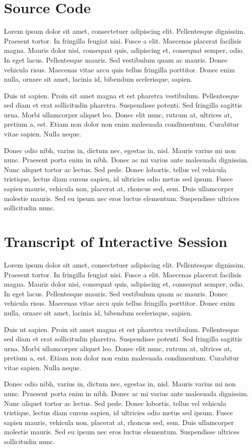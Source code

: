 \documentclass[11pt,letterpaper,onecolumn,twoside,openright,draft]{report}
\begin{document}
\chapter{Source Code}
Lorem ipsum dolor sit amet, consectetuer adipiscing elit. Pellentesque dignissim.
Praesent tortor.
In fringilla feugiat nisi.
Fusce a elit.
Maecenas placerat facilisis magna.
Mauris dolor nisi, consequat quis, adipiscing et, consequat semper, odio.
In eget lacus.
Pellentesque mauris.
Sed vestibulum quam ac mauris.
Donec vehicula risus.
Maecenas vitae arcu quis tellus fringilla porttitor.
Donec enim nulla, ornare sit amet, lacinia id, bibendum scelerisque, sapien.

Duis ut sapien.
Proin sit amet magna et est pharetra vestibulum.
Pellentesque sed diam et erat sollicitudin pharetra.
Suspendisse potenti.
Sed fringilla sagittis urna.
Morbi ullamcorper aliquet leo.
Donec elit nunc, rutrum at, ultrices at, pretium a, est.
Etiam non dolor non enim malesuada condimentum.
Curabitur vitae sapien.
Nulla neque.

Donec odio nibh, varius in, dictum nec, egestas in, nisl.
Mauris varius mi non nunc.
Praesent porta enim in nibh.
Donec ac mi varius ante malesuada dignissim.
Nunc aliquet tortor ac lectus.
Sed pede.
Donec lobortis, tellus vel vehicula tristique, lectus diam cursus sapien, id ultricies odio metus sed ipsum.
Fusce sapien mauris, vehicula non, placerat at, rhoncus sed, sem.
Duis ullamcorper molestie mauris.
Sed eu ipsum nec eros luctus elementum.
Suspendisse ultrices sollicitudin nunc.


\chapter{Transcript of Interactive Session}
Lorem ipsum dolor sit amet, consectetuer adipiscing elit. Pellentesque dignissim.
Praesent tortor.
In fringilla feugiat nisi.
Fusce a elit.
Maecenas placerat facilisis magna.
Mauris dolor nisi, consequat quis, adipiscing et, consequat semper, odio.
In eget lacus.
Pellentesque mauris.
Sed vestibulum quam ac mauris.
Donec vehicula risus.
Maecenas vitae arcu quis tellus fringilla porttitor.
Donec enim nulla, ornare sit amet, lacinia id, bibendum scelerisque, sapien.

Duis ut sapien.
Proin sit amet magna et est pharetra vestibulum.
Pellentesque sed diam et erat sollicitudin pharetra.
Suspendisse potenti.
Sed fringilla sagittis urna.
Morbi ullamcorper aliquet leo.
Donec elit nunc, rutrum at, ultrices at, pretium a, est.
Etiam non dolor non enim malesuada condimentum.
Curabitur vitae sapien.
Nulla neque.

Donec odio nibh, varius in, dictum nec, egestas in, nisl.
Mauris varius mi non nunc.
Praesent porta enim in nibh.
Donec ac mi varius ante malesuada dignissim.
Nunc aliquet tortor ac lectus.
Sed pede.
Donec lobortis, tellus vel vehicula tristique, lectus diam cursus sapien, id ultricies odio metus sed ipsum.
Fusce sapien mauris, vehicula non, placerat at, rhoncus sed, sem.
Duis ullamcorper molestie mauris.
Sed eu ipsum nec eros luctus elementum.
Suspendisse ultrices sollicitudin nunc.




\end{document}
